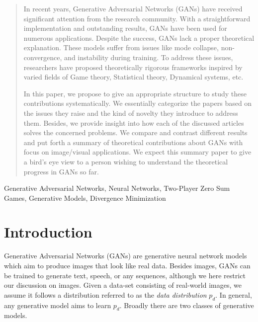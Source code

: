 
\begin{abstract}
In recent years, Generative Adversarial Networks (GANs) have received significant attention from the research community. With a straightforward implementation and outstanding results, GANs have been used for numerous applications. Despite the success, GANs lack a proper theoretical explanation. These models suffer from issues like mode collapse, non-convergence, and instability during training. To address these issues, researchers have proposed theoretically rigorous frameworks inspired by varied fields of Game theory, Statistical theory, Dynamical systems, etc. 

In this paper, we propose to give an appropriate structure to study these contributions systematically. We essentially categorize the papers based on the issues they raise and the kind of novelty they introduce to address them.  Besides, we provide insight into how each of the discussed articles solves the concerned problems. We compare and contrast different results and put forth a summary of theoretical contributions about GANs with focus on image/visual applications. We expect this summary paper to give a bird's eye view to a person wishing to understand the theoretical progress in GANs so far.
\end{abstract}



\begin{keywords}
  Generative Adversarial Networks, Neural Networks, Two-Player Zero Sum Games, Generative Models, Divergence Minimization  
\end{keywords}

\section{Introduction}

Generative Adversarial Networks (GANs) \citep{ganGoodfellow} are generative neural network models which aim to produce images that look like real data. Besides images, GANs can be trained to generate text, speech, or any sequences, although we here restrict our discussion on images. Given a data-set consisting of real-world images, we assume it follows a distribution referred to as the \emph{data distribution} $p_d$. In general, any generative model aims to learn $p_d$. Broadly there are two classes of generative models.

